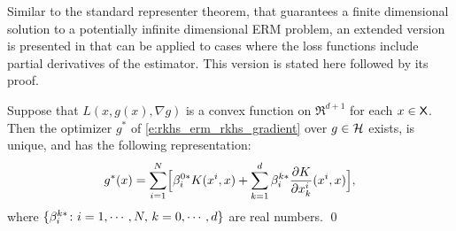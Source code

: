 Similar to the standard representer theorem, that guarantees a finite dimensional solution to a potentially infinite dimensional ERM problem, an extended version is presented in \cite{zho08} that can be applied to cases where the loss functions include partial derivatives of the estimator. This version is stated here followed by its proof. 
\begin{theorem}
	\label{theorem:ext_rep_theorem}
	Suppose that $L(x, g(x),\nabla g)$ is a convex function on $\Re^{d+1}$ for each $x\in{\sf X}$.
	Then the  optimizer $g^*$ of \eqref{e:rkhs_erm_rkhs_gradient} over $g\in{\cal H}$ exists, is unique, and has the following representation: 
	\begin{equation}
	g^*(x) = \sum_{i=1}^N  \Bigl[
	\rkhsparam_i^{0*}  K(x^i,x)   +  \sum_{k =1}^d  \rkhsparam_i^{k*} \frac{\partial K}{\partial x^i_k} (x^i, x) \Bigr],
	\label{e:rkhs_ext_rep_theorem}
	\end{equation}
	where $\{\beta_i^{k*} \colon i=1,\cdots,N,\, k = 0,\cdots,d\}$ are real numbers.
	\qed
\end{theorem}
